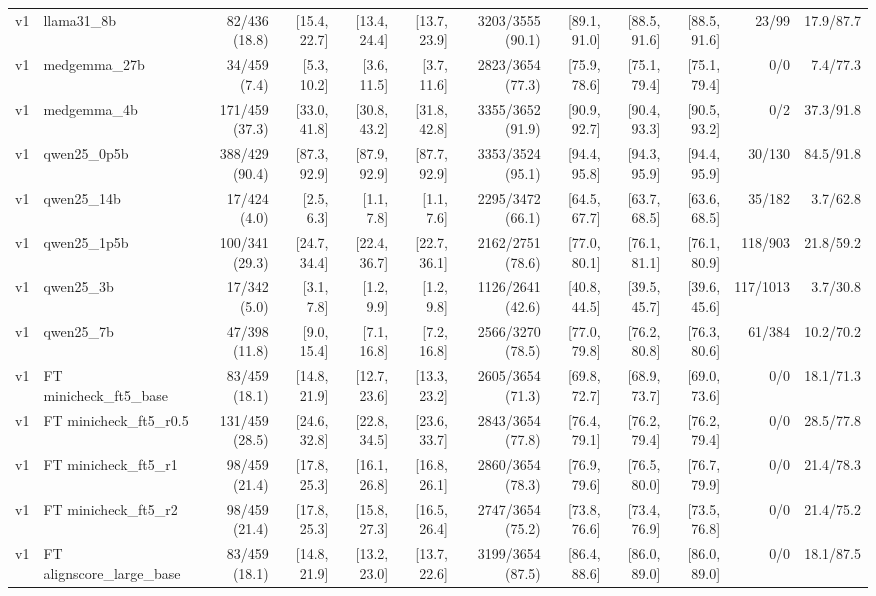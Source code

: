 \begin{table}[t]
{\begin{tabular}{llrrrrrrrrrr}
v1 & llama31\_8b & 82/436 (18.8) & [15.4, 22.7] & [13.4, 24.4] & [13.7, 23.9] & 3203/3555 (90.1) & [89.1, 91.0] & [88.5, 91.6] & [88.5, 91.6] & 23/99 & 17.9/87.7 \\
v1 & medgemma\_27b & 34/459 (7.4) & [5.3, 10.2] & [3.6, 11.5] & [3.7, 11.6] & 2823/3654 (77.3) & [75.9, 78.6] & [75.1, 79.4] & [75.1, 79.4] & 0/0 & 7.4/77.3 \\
v1 & medgemma\_4b & 171/459 (37.3) & [33.0, 41.8] & [30.8, 43.2] & [31.8, 42.8] & 3355/3652 (91.9) & [90.9, 92.7] & [90.4, 93.3] & [90.5, 93.2] & 0/2 & 37.3/91.8 \\
v1 & qwen25\_0p5b & 388/429 (90.4) & [87.3, 92.9] & [87.9, 92.9] & [87.7, 92.9] & 3353/3524 (95.1) & [94.4, 95.8] & [94.3, 95.9] & [94.4, 95.9] & 30/130 & 84.5/91.8 \\
v1 & qwen25\_14b & 17/424 (4.0) & [2.5, 6.3] & [1.1, 7.8] & [1.1, 7.6] & 2295/3472 (66.1) & [64.5, 67.7] & [63.7, 68.5] & [63.6, 68.5] & 35/182 & 3.7/62.8 \\
v1 & qwen25\_1p5b & 100/341 (29.3) & [24.7, 34.4] & [22.4, 36.7] & [22.7, 36.1] & 2162/2751 (78.6) & [77.0, 80.1] & [76.1, 81.1] & [76.1, 80.9] & 118/903 & 21.8/59.2 \\
v1 & qwen25\_3b & 17/342 (5.0) & [3.1, 7.8] & [1.2, 9.9] & [1.2, 9.8] & 1126/2641 (42.6) & [40.8, 44.5] & [39.5, 45.7] & [39.6, 45.6] & 117/1013 & 3.7/30.8 \\
v1 & qwen25\_7b & 47/398 (11.8) & [9.0, 15.4] & [7.1, 16.8] & [7.2, 16.8] & 2566/3270 (78.5) & [77.0, 79.8] & [76.2, 80.8] & [76.3, 80.6] & 61/384 & 10.2/70.2 \\
v1 & FT minicheck\_ft5\_base & 83/459 (18.1) & [14.8, 21.9] & [12.7, 23.6] & [13.3, 23.2] & 2605/3654 (71.3) & [69.8, 72.7] & [68.9, 73.7] & [69.0, 73.6] & 0/0 & 18.1/71.3 \\
v1 & FT minicheck\_ft5\_r0.5 & 131/459 (28.5) & [24.6, 32.8] & [22.8, 34.5] & [23.6, 33.7] & 2843/3654 (77.8) & [76.4, 79.1] & [76.2, 79.4] & [76.2, 79.4] & 0/0 & 28.5/77.8 \\
v1 & FT minicheck\_ft5\_r1 & 98/459 (21.4) & [17.8, 25.3] & [16.1, 26.8] & [16.8, 26.1] & 2860/3654 (78.3) & [76.9, 79.6] & [76.5, 80.0] & [76.7, 79.9] & 0/0 & 21.4/78.3 \\
v1 & FT minicheck\_ft5\_r2 & 98/459 (21.4) & [17.8, 25.3] & [15.8, 27.3] & [16.5, 26.4] & 2747/3654 (75.2) & [73.8, 76.6] & [73.4, 76.9] & [73.5, 76.8] & 0/0 & 21.4/75.2 \\
v1 & FT alignscore\_large\_base & 83/459 (18.1) & [14.8, 21.9] & [13.2, 23.0] & [13.7, 22.6] & 3199/3654 (87.5) & [86.4, 88.6] & [86.0, 89.0] & [86.0, 89.0] & 0/0 & 18.1/87.5 \\

\end{tabular}}
\end{table}
